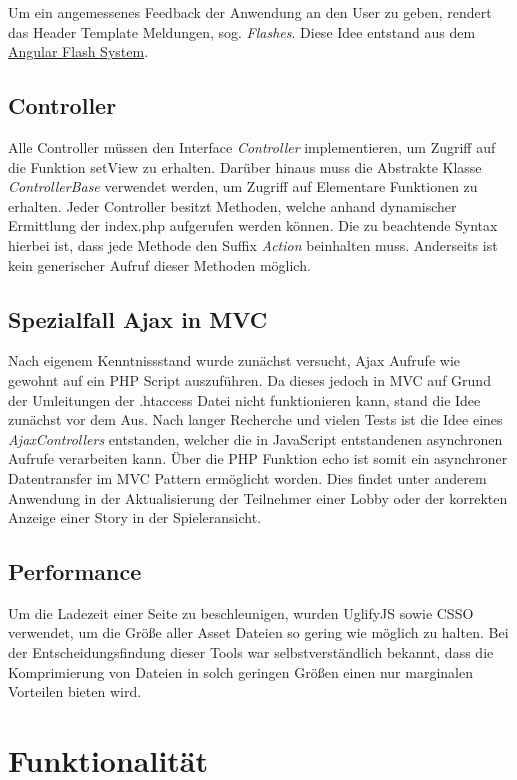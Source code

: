 Um ein angemessenes Feedback der Anwendung an den User zu geben, rendert das Header Template Meldungen, sog. \emph{Flashes}. Diese Idee entstand aus dem \hyperlink{https://sachinchoolur.github.io/angular-flash/}{Angular Flash System}.
\subsection{Controller}\label{subsec:controller}
Alle Controller müssen den Interface \emph{Controller} implementieren, um Zugriff auf die Funktion setView zu erhalten. Darüber hinaus muss die Abstrakte Klasse \emph{ControllerBase} verwendet werden, um Zugriff auf Elementare Funktionen zu erhalten. Jeder Controller besitzt Methoden, welche anhand dynamischer Ermittlung der index.php aufgerufen werden können. Die zu beachtende Syntax hierbei ist, dass jede Methode den Suffix \emph{Action} beinhalten muss. Anderseits ist kein generischer Aufruf dieser Methoden möglich. 

\subsection{Spezialfall Ajax in MVC}\label{subsec:ajax}
Nach eigenem Kenntnissstand wurde zunächst versucht, Ajax Aufrufe wie gewohnt auf ein PHP Script auszuführen. Da dieses jedoch in MVC auf Grund der Umleitungen der .htaccess Datei nicht funktionieren kann, stand die Idee zunächst vor dem Aus. Nach langer Recherche und vielen Tests ist die Idee eines \emph{AjaxControllers} entstanden, welcher die in JavaScript entstandenen asynchronen Aufrufe verarbeiten kann. Über die PHP Funktion echo ist somit ein asynchroner Datentransfer im MVC Pattern ermöglicht worden. Dies findet unter anderem Anwendung in der Aktualisierung der Teilnehmer einer Lobby oder der korrekten Anzeige einer Story in der Spieleransicht. 

\subsection{Performance}\label{subsec:performance}
Um die Ladezeit einer Seite zu beschleunigen, wurden UglifyJS sowie CSSO verwendet, um die Größe aller Asset Dateien so gering wie möglich zu halten. Bei der Entscheidungsfindung dieser Tools war selbstverständlich bekannt, dass die Komprimierung von Dateien in solch geringen Größen einen nur marginalen Vorteilen bieten wird.

\section{Funktionalität}\label{sec:funktionalität}

